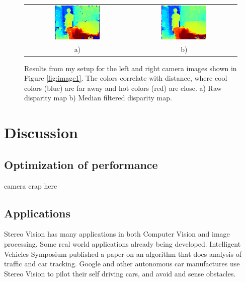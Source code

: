 \documentclass[11pt,fleqn]{article}
\begin{document}
\begin{figure}[!h]
\begin{mdframed}
\centering
\setlength{}
\begin{tabular}{cc}
\includegraphics[width=0.45\textwidth]{images/res.png} &
\includegraphics[width=0.45\textwidth]{images/nomedres.png} \\[2pt]
a) & b) \\
\end{tabular}
\caption[Results from my setup]{Results from my setup for the left and right camera images shown in Figure \ref{fig:image1}. The colors correlate with distance, where cool colors (blue) are far away and hot colors (red) are close. a) Raw disparity map b) Median filtered disparity map.}
\label{fig:image2}
\end{mdframed}
\end{figure}

\section{Discussion}

\subsection{Optimization of performance}
camera crap here

\subsection{Applications}

Stereo Vision has many applications in both Computer Vision and image processing. Some real world applications already being developed. Intelligent Vehicles Symposium published a paper on an algorithm that does analysis of traffic and car tracking. Google and other autonomous car manufactures use Stereo Vision to pilot their self driving cars, and avoid and sense obstacles.
\end{document}

